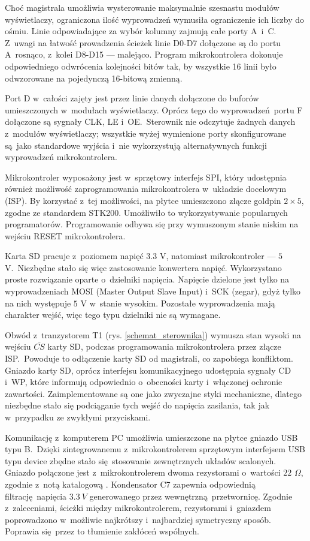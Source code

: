 Choć magistrala umożliwia wysterowanie maksymalnie szesnastu modułów wyświetlaczy, ograniczona ilość wyprowadzeń wymusiła ograniczenie ich liczby do ośmiu. Linie odpowiadające za wybór kolumny zajmują całe porty A~i~C. Z~uwagi na łatwość prowadzenia ścieżek linie D0-D7 dołączone są do portu A~rosnąco, z~kolei D8-D15 --- malejąco. Program mikrokontrolera dokonuje odpowiedniego odwrócenia kolejności bitów tak, by wszystkie 16 linii było odwzorowane na pojedynczą 16-bitową zmienną.

Port D w~całości zajęty jest przez linie danych dołączone do buforów umieszczonych w~modułach wyświetlaczy. Oprócz tego do wyprowadzeń portu F dołączone są sygnały CLK, LE i~OE.~Sterownik nie odczytuje żadnych danych z~modułów wyświetlaczy; wszystkie wyżej wymienione porty skonfigurowane są jako standardowe wyjścia i~nie wykorzystują alternatywnych funkcji wyprowadzeń mikrokontrolera.

Mikrokontroler wyposażony jest w~sprzętowy interfejs SPI, który udostępnia również możliwość zaprogramowania mikrokontrolera w~układzie docelowym (ISP). By korzystać z~tej możliwości, na płytce umieszczono złącze goldpin $2 \times 5$, zgodne ze standardem STK200. Umożliwiło to wykorzystywanie popularnych programatorów. Programowanie odbywa się przy wymuszonym stanie niskim na wejściu RESET mikrokontrolera.

Karta SD pracuje z~poziomem napięć $3.3$ V, natomiast mikrokontroler --- $5$ V.~Niezbędne stało się więc zastosowanie konwertera napięć. Wykorzystano proste rozwiązanie oparte o~dzielniki napięcia. Napięcie dzielone jest tylko na wyprowadzeniach MOSI (Master Output Slave Input) i~SCK (zegar), gdyż tylko na nich występuje $5$ V w~stanie wysokim. Pozostałe wyprowadzenia mają charakter wejść, więc tego typu dzielniki nie są wymagane.

Obwód z~tranzystorem T1 (rys. \ref{schemat_sterownika}) wymusza stan wysoki na wejściu $\overline{CS}$ karty SD, podczas programowania mikrokontrolera przez złącze ISP.~Powoduje to odłączenie karty SD od magistrali, co zapobiega konfliktom. Gniazdo karty SD, oprócz interfejsu komunikacyjnego udostępnia sygnały CD i~WP, które informują odpowiednio o~obecności karty i~włączonej ochronie zawartości. Zaimplementowane są one jako zwyczajne styki mechaniczne, dlatego niezbędne stało się podciąganie tych wejść do napięcia zasilania, tak jak w~przypadku ze zwykłymi przyciskami.

Komunikację z~komputerem PC umożliwia umieszczone na płytce gniazdo USB typu B.~Dzięki zintegrowanemu z~mikrokontrolerem sprzętowym interfejsem USB typu device zbędne stało się stosowanie zewnętrznych układów scalonych. Gniazdo połączone jest z~mikrokontrolerem dwoma rezystorami o~wartości $22$ $\Omega$, zgodnie z~notą katalogową \cite{ds-avr}. Kondensator C7 zapewnia odpowiednią filtrację napięcia $3.3~V$ generowanego przez wewnętrzną przetwornicę. Zgodnie z~zaleceniami, ścieżki między mikrokontrolerem, rezystorami i~gniazdem poprowadzono w~możliwie najkrótszy i~najbardziej symetryczny sposób. Poprawia się przez to tłumienie zakłóceń wspólnych.


